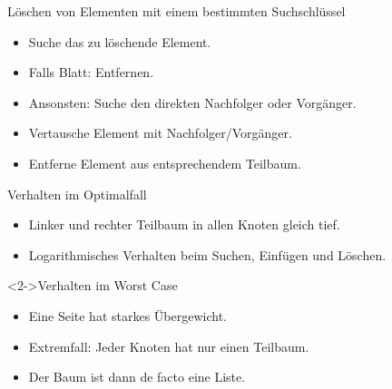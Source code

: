 \begin{frame}
    \begin{block}{Löschen von Elementen mit einem bestimmten Suchschlüssel}
        \begin{itemize}
            \item Suche das zu löschende Element.
            \item Falls Blatt: Entfernen.
            \item Ansonsten: Suche den direkten Nachfolger oder Vorgänger.
            \item Vertausche Element mit Nachfolger/Vorgänger.
            \item Entferne Element aus entsprechendem Teilbaum.
        \end{itemize}
    \end{block}
\end{frame}

\begin{frame}    
    \begin{block}{Verhalten im Optimalfall}
        \begin{itemize}
            \item Linker und rechter Teilbaum in allen Knoten gleich tief.
            \item Logarithmisches Verhalten beim Suchen, Einfügen und Löschen.
        \end{itemize}
    \end{block}
    \begin{block}<2->{Verhalten im Worst Case}
        \begin{itemize}
            \item Eine Seite hat starkes Übergewicht.
            \item Extremfall: Jeder Knoten hat nur einen Teilbaum.
            \item Der Baum ist dann de facto eine Liste.
        \end{itemize}
    \end{block}
\end{frame}

